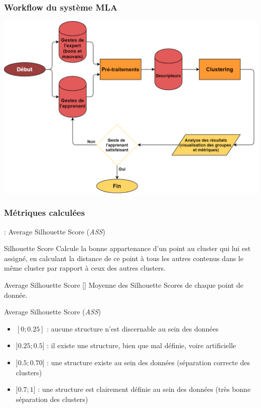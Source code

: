 \documentclass[svgnames]{beamer}
\newcommand{\mycite}[1]{[\textit{\cite{#1}}]}
\begin{document}
	\subsubsection{Workflow du système MLA}
	\begin{frame}{\subsubsecname}
	\centering
		\includegraphics[scale=0.25]{img/workflow_MLA.png}
	\end{frame}
	
	\subsubsection{Métriques calculées}
	\begin{frame}{\subsubsecname : Average Silhouette Score (\textit{ASS})}
		\begin{block}{Silhouette Score}
			Calcule la bonne appartenance d'un point au cluster qui lui est assigné, en calculant la distance de ce point à tous les autres contenus dans le même cluster par rapport à ceux des autres clusters.
		\end{block}
		
		\begin{block}{Average Silhouette Score \mycite{Rousseeuw1987Sag}}
			Moyenne des Silhouette Scores de chaque point de donnée.
		\end{block}
	\end{frame}
	
	\begin{frame}{Average Silhouette Score (\textit{ASS})}
		\begin{itemize}[label=$\bullet$]
			\item $[0;0.25]$ : aucune structure n'est discernable au sein des données
			\item$ ]0.25; 0.5]$ : il existe une structure, bien que mal définie, voire artificielle
			\item $]0.5;0.70
			]$ : une structure existe au sein des données (séparation correcte des clusters)
			\item $]0.7;1]$ : une structure est clairement définie au sein des données (très bonne séparation des clusters)
		\end{itemize}
	\end{frame}
	
\end{document}
